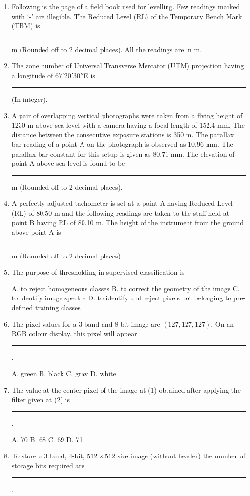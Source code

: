 \documentclass[journal,12pt,onecolumn]{IEEEtran}
\begin{document}
\begin{enumerate}
    \item Following is the page of a field book used for levelling. Few readings marked with ‘-’ are illegible. The Reduced Level (RL) of the Temporary Bench Mark (TBM) is \rule{3cm}{0.15mm} m (Rounded off to 2 decimal places). All the readings are in m.

    \item The zone number of Universal Transverse Mercator (UTM) projection having a longitude of $67^\circ 20' 30''$E is \rule{3cm}{0.15mm} (In integer).

    \item A pair of overlapping vertical photographs were taken from a flying height of 1230 m above sea level with a camera having a focal length of 152.4 mm. The distance between the consecutive exposure stations is 350 m. The parallax bar reading of a point A on the photograph is observed as 10.96 mm. The parallax bar constant for this setup is given as 80.71 mm. The elevation of point A above sea level is found to be \rule{3cm}{0.15mm} m (Rounded off to 2 decimal places).

    \item A perfectly adjusted tachometer is set at a point A having Reduced Level (RL) of 80.50 m and the following readings are taken to the staff held at point B having RL of 80.10 m. The height of the instrument from the ground above point A is \rule{3cm}{0.15mm} m (Rounded off to 2 decimal places).

    \item The purpose of thresholding in supervised classification is

    A. to reject homogeneous classes \quad
    B. to correct the geometry of the image \quad
    C. to identify image speckle \quad
    D. to identify and reject pixels not belonging to pre-defined training classes

    \item The pixel values for a 3 band and 8-bit image are $(127, 127, 127)$. On an RGB colour display, this pixel will appear \rule{3cm}{0.15mm}.

    A. green \quad
    B. black \quad
    C. gray \quad
    D. white

    \item The value at the center pixel of the image at (1) obtained after applying the filter given at (2) is \rule{3cm}{0.15mm}.

    A. 70 \quad
    B. 68 \quad
    C. 69 \quad
    D. 71

    \item To store a 3 band, 4-bit, $512 \times 512$ size image (without header) the number of storage bits required are \rule{3cm}{0.15mm}.


\end{enumerate}
\end{document}
